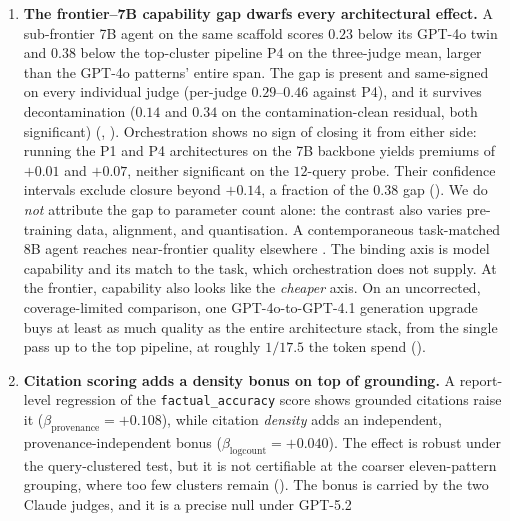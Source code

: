 \documentclass[11pt]{article}
\newcommand{\dimrow}[1]{\texttt{#1}}
\begin{document}
\begin{enumerate}[leftmargin=1.5em,itemsep=2pt,topsep=2pt]
architectures that do not. Bounded returns also reproduces externally. Across six independent,
publicly released deep-research codebases (plus one run under a second search backend), the
top four of the seven arms land
within $0.018$ of one another on the primary judge. The leaderboard order itself is
judge-family-dependent, though, and none of the pairwise rank agreements reaches significance at
this sample size ().
\item \textbf{The frontier--7B capability gap dwarfs every architectural effect.} A
sub-frontier 7B agent on the same scaffold scores $0.23$ below its GPT-4o twin and
$0.38$ below the top-cluster pipeline P4 on the three-judge mean, larger than the
GPT-4o patterns' entire span. The gap is present and same-signed on every
individual judge (per-judge $0.29$--$0.46$ against P4), and it survives decontamination
($0.14$ and $0.34$ on the contamination-clean residual, both significant)
(, ). Orchestration shows no sign of closing it from either side:
running the P1
and P4 architectures on the 7B backbone yields premiums of $+0.01$ and $+0.07$,
neither significant on the $12$-query probe. Their confidence intervals exclude
closure beyond $+0.14$, a fraction of the $0.38$ gap (). We do \emph{not} attribute the gap to parameter count alone: the
contrast also varies pre-training data, alignment, and quantisation. A
contemporaneous task-matched 8B agent reaches near-frontier quality elsewhere
\citep{shao2025drtulu}. The binding axis is model capability and its match to the
task, which orchestration does not supply. At the frontier, capability also looks like the
\emph{cheaper} axis. On an uncorrected, coverage-limited comparison, one GPT-4o-to-GPT-4.1
generation upgrade buys at least as much quality as the entire architecture stack, from the
single pass up to the top pipeline, at roughly $1/17.5$ the token spend ().
\item \textbf{Citation scoring adds a density bonus on top of grounding.} A
report-level regression of the \dimrow{factual\_accuracy} score shows grounded citations
raise it ($\beta_{\text{provenance}}{=}{+}0.108$), while citation \emph{density} adds an
independent, provenance-independent bonus ($\beta_{\log\text{count}}{=}{+}0.040$). The
effect is robust under the query-clustered test, but it is not certifiable at the coarser
eleven-pattern grouping, where too few clusters remain (). The bonus
is carried by the two Claude judges, and it is a precise null under GPT-5.2

\end{enumerate}
\end{document}
